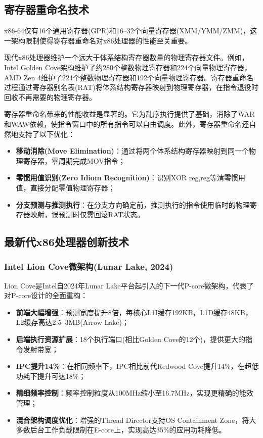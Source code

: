 \documentclass[12pt,a4paper]{IEEEtran}
\begin{document}
\subsection{寄存器重命名技术}

x86-64仅有16个通用寄存器(GPR)和16--32个向量寄存器(XMM/YMM/ZMM)，这一架构限制使得寄存器重命名对x86处理器的性能至关重要\cite{smith1998registerrenaming}。

现代x86处理器维护一个远大于体系结构寄存器数量的物理寄存器文件。例如，Intel Golden Cove架构维护了约280个整数物理寄存器和224个向量物理寄存器，AMD Zen 4维护了224个整数物理寄存器和192个向量物理寄存器。寄存器重命名过程通过寄存器别名表(RAT)将体系结构寄存器映射到物理寄存器，在指令退役时回收不再需要的物理寄存器。

寄存器重命名带来的性能收益是显著的。它为乱序执行提供了基础，消除了WAR和WAW依赖，使指令窗口中的所有指令可以自由调度。此外，寄存器重命名还自然地支持了以下优化：
\begin{itemize}
\item \textbf{移动消除(Move Elimination)}：通过将两个体系结构寄存器映射到同一个物理寄存器，零周期完成MOV指令；
\item \textbf{零惯用值识别(Zero Idiom Recognition)}：识别XOR reg,reg等清零惯用值，直接分配零值物理寄存器；
\item \textbf{分支预测与推测执行}：在分支方向确定前，推测执行的指令使用临时的物理寄存器映射，误预测时仅需回滚RAT状态。
\end{itemize}

\subsection{最新代x86处理器创新技术}

\subsubsection{Intel Lion Cove微架构(Lunar Lake, 2024)}

Lion Cove是Intel自2024年Lunar Lake平台起引入的下一代P-core微架构，代表了对P-core设计的全面重构\cite{intel2024lioncove}：

\begin{itemize}
\item \textbf{前端大幅增强}：预测宽度提升8倍，每核心L1I缓存192KB，L1D缓存48KB，L2缓存高达2.5--3MB(Arrow Lake)；
\item \textbf{后端执行资源扩展}：18个执行端口(相比Golden Cove的12个)，提供更大的指令发射带宽；
\item \textbf{IPC提升14\%}：在相同频率下，IPC相比前代Redwood Cove提升14\%，在超低功耗下提升可达18\%；
\item \textbf{精细频率控制}：频率控制粒度从100MHz缩小至16.7MHz，实现更精确的能效管理；
\item \textbf{混合架构调度优化}：增强的Thread Director支持OS Containment Zone，将大多数后台工作负载限制在E-core上，实现高达35\%的应用功耗降低。
\end{itemize}
\end{document}
